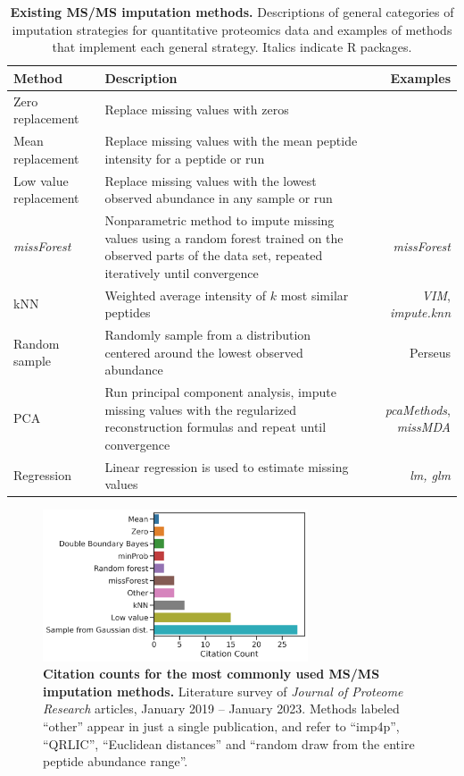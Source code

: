 \documentclass{article}
\begin{document}
\begin{table}
  \small
  \centering
  \begin{tabular}{lp{3.5in}r}
    \hline
    Method & Description & Examples \\
    \hline
    Zero replacement & Replace missing values with zeros & \\
    Mean replacement & Replace missing values with the mean peptide intensity for a peptide or run & \\
    Low value replacement & Replace missing values with the lowest observed abundance in any sample or run & \\
    \textit{missForest} & Nonparametric method to impute missing values
using a random forest trained on the observed parts of the data set,
repeated iteratively until convergence & \textit{missForest} \cite{missForest} \\
    kNN & Weighted average intensity of $k$ most similar peptides & \textit{VIM}, \textit{impute.knn} \cite{VIM, knn-impute} \\
    Random sample & Randomly sample from a distribution centered around the lowest observed abundance & Perseus \cite{Perseus} \\
    PCA & Run principal component analysis, impute missing values with the regularized reconstruction formulas and repeat until convergence & \textit{pcaMethods}, \textit{missMDA} \cite{pcaMethods, missMDA} \\
    Regression & Linear regression is used to estimate missing values & \textit{lm, glm} \\
    \hline
  \end{tabular}
  \caption{{\bf Existing MS/MS imputation methods.} Descriptions of general categories of imputation strategies for quantitative proteomics data and examples of methods that implement each general strategy. Italics indicate R packages. 
    \label{tab:method-descrip}}
\end{table}

\begin{figure}
\centering
\includegraphics[width=0.7\textwidth]{figures/imp-lit-seq-results-update.png}
\caption{{\bf Citation counts for the most commonly used MS/MS imputation methods.} Literature survey of \textit{Journal of Proteome Research} articles, January 2019 -- January 2023. Methods labeled “other” appear in just a single publication, and refer to ``imp4p'', ``QRLIC'', ``Euclidean distances'' and ``random draw from the entire peptide abundance range''.}
\label{fig:citation-counts}
\end{figure}
\end{document}
